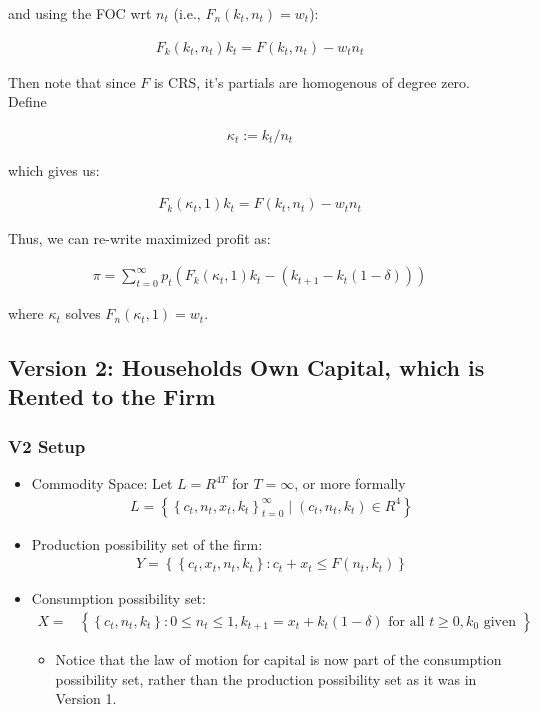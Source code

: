 \documentclass[10pt]{article}
\begin{document}
and using the FOC wrt $n_t$ (i.e., $F_n\left(k_t, n_t\right)=w_t$):

\begin{align}
    F_k\left(k_t, n_t\right) k_t=F\left(k_t, n_t\right)-w_t n_t
\end{align}

Then note that since $F$ is CRS, it's partials 
are homogenous of degree zero. 
Define

\begin{align}
    \kappa_t:=k_t / n_t
\end{align}

which gives us:

\begin{align}
    F_k\left(\kappa_t, 1\right) k_t=F\left(k_t, n_t\right)-w_t n_t
\end{align}

Thus, we can re-write maximized profit as:

\begin{align}
    \pi=\sum_{t=0}^{\infty} p_t\left(F_k\left(\kappa_t, 1\right) k_t-\left(k_{t+1}-k_t(1-\delta)\right)\right)
\end{align}

where $\kappa_t$ solves $F_n\left(\kappa_t, 1\right)=w_t$.

\subsection{Version 2: Households Own Capital, which is Rented to the Firm}

\subsubsection{V2 Setup}

\begin{itemize}
    \item Commodity Space:
        Let $L=R^{4 T}$ for $T=\infty$, or more formally
        \begin{align}
            L=\left\{\left\{c_t, n_t, x_t, k_t\right\}_{t=0}^{\infty} \mid\left(c_t, n_t, k_t\right) \in R^4\right\}
        \end{align}
    \item Production possibility set of the firm:
        \begin{align}
            Y=\left\{\left\{c_t, x_t, n_t, k_t\right\}: c_t+x_t \leq F\left(n_t, k_t\right)\right\}
        \end{align}
    \item Consumption possibility set:
        \begin{align}
            X= & \left\{\left\{c_t, n_t, k_t\right\}: 0 \leq n_t \leq 1, k_{t+1}=x_t+k_t(1-\delta) \text { for all } t \geq 0, k_0 \text { given }\right\}
        \end{align}
        \begin{itemize}
            \item Notice that the law of motion for capital is now part of the consumption possibility set, 
                rather than the production possibility set as it was in Version 1.
        \end{itemize}
\end{itemize}
\end{document}
